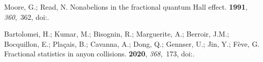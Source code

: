 \documentclass[preprints,article,accept,moreauthors,pdftex]{Definitions/mdpi}
\begin{document}
\begin{thebibliography}{999}
Moore, G.; Read, N.
\newblock Nonabelions in the fractional quantum {H}all effect.
 {\bf 1991}, {\em 360},~362,
\newblock
  doi:{\href{https://doi.org/10.1016/0550-3213(91)90407-O}{}}.

Bartolomei, H.; Kumar, M.; Bisognin, R.; Marguerite, A.; Berroir,
  J.M.; Bocquillon, E.; Pla{\c c}ais, B.; Cavanna, A.; Dong, Q.; Gennser, U.;
  Jin, Y.; F{\`e}ve, G.
\newblock Fractional statistics in anyon collisions.
 {\bf 2020}, {\em 368},~173\color{black},
\newblock
  doi:{\href{https://doi.org/10.1126/science.aaz5601}{}}.

\end{thebibliography}


\end{document}
